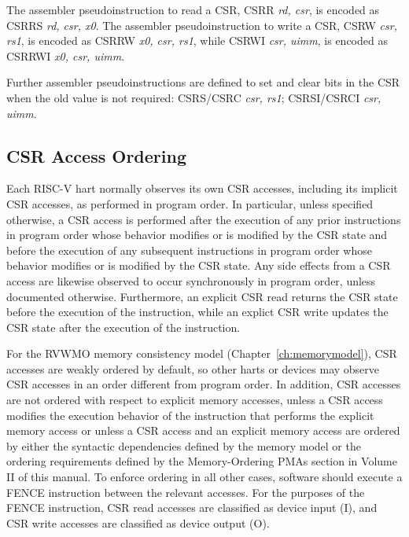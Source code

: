 The assembler pseudoinstruction to read a CSR, CSRR {\em rd, csr}, is
encoded as CSRRS {\em rd, csr, x0}.  The assembler pseudoinstruction
to write a CSR, CSRW {\em csr, rs1}, is encoded as CSRRW {\em x0, csr,
  rs1}, while CSRWI {\em csr, uimm}, is encoded as CSRRWI {\em x0,
  csr, uimm}.

Further assembler pseudoinstructions are defined to set and clear
bits in the CSR when the old value is not required: CSRS/CSRC {\em
  csr, rs1}; CSRSI/CSRCI {\em csr, uimm}.


\subsection*{CSR Access Ordering}

Each RISC-V hart normally observes its own CSR accesses, including its
implicit CSR accesses, as performed in program order.
In particular, unless specified otherwise, a CSR access is performed
after the execution of any prior instructions in program order whose behavior
modifies or is modified by the CSR state and before the execution of any
subsequent instructions in program order whose behavior modifies or is modified
by the CSR state.
Any side effects from a CSR access are likewise observed to occur
synchronously in program order, unless documented otherwise.
Furthermore, an explicit CSR read returns the
CSR state before the execution of the instruction, while an
explict CSR write updates the CSR state after the execution of the
instruction.

For the RVWMO memory consistency model (Chapter~\ref{ch:memorymodel}),
CSR accesses are weakly ordered by default,
so other harts or devices may observe CSR accesses in an order
different from program order. In addition, CSR accesses are not ordered with
respect to explicit memory accesses, unless a CSR access modifies the execution
behavior of the instruction that performs the explicit memory access or unless
a CSR access and an explicit memory access are ordered by either the syntactic
dependencies defined by the memory model or the ordering requirements defined
by the Memory-Ordering PMAs section in Volume II of this manual. To enforce
ordering in all other cases, software should execute a FENCE instruction
between the relevant accesses. For the purposes of the FENCE instruction, CSR
read accesses are classified as device input (I), and CSR write accesses are
classified as device output (O).

